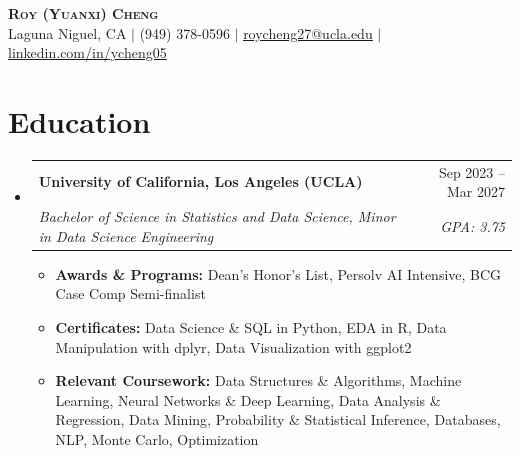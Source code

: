 \documentclass[letterpaper,11pt]{article}
\makeatletter
\newcommand{\resumeItem}[1]{
  \item\small{#1}
}
\newcommand{\resumeSubheading}[4]{
  \vspace{-2pt}\item
    \begin{tabular*}{\textwidth}[t]{l@{\extracolsep{\fill}}r}
      \textbf{#1} & #2 \\
      \textit{\small#3} & \textit{\small #4} \\
    \end{tabular*}\vspace{-7pt}
}
\newcommand{\resumeSubHeadingListStart}{\begin{itemize}[leftmargin=0in, label={}]}
\newcommand{\resumeSubHeadingListEnd}{\end{itemize}}
\newcommand{\resumeItemListStart}{\begin{itemize}[itemsep= 1.5pt, parsep=0pt]}
\newcommand{\resumeItemListEnd}{\end{itemize}\vspace{-5pt}}
\makeatother
\begin{document}
\begin{center}
    \textbf{\LARGE \scshape Roy (Yuanxi) Cheng} \\ \vspace{3pt}
    \small Laguna Niguel, CA $|$ (949) 378-0596 $|$
    \href{mailto:roycheng27@ucla.edu}{\underline{roycheng27@ucla.edu}} $|$
    \href{https://www.linkedin.com/in/ycheng05}{\underline{linkedin.com/in/ycheng05}}
\end{center}
\section{Education}
  \resumeSubHeadingListStart
    \resumeSubheading
      {University of California, Los Angeles (UCLA)}{Sep 2023 -- Mar 2027}
      {Bachelor of Science in Statistics and Data Science, Minor in Data Science Engineering}{GPA: 3.75}
      \resumeItemListStart
        \resumeItem{\textbf{Awards \& Programs:} Dean's Honor's List, Persolv AI Intensive, BCG Case Comp Semi-finalist}
        \resumeItem{\textbf{Certificates:} Data Science \& SQL in Python, EDA in R, Data Manipulation with dplyr, Data Visualization with ggplot2}
        \resumeItem{\textbf{Relevant Coursework:} Data Structures \& Algorithms, Machine Learning, Neural Networks \& Deep Learning, Data Analysis \& Regression, Data Mining, Probability \& Statistical Inference, Databases, NLP, Monte Carlo, Optimization}
      \resumeItemListEnd
  \resumeSubHeadingListEnd
\end{document}
